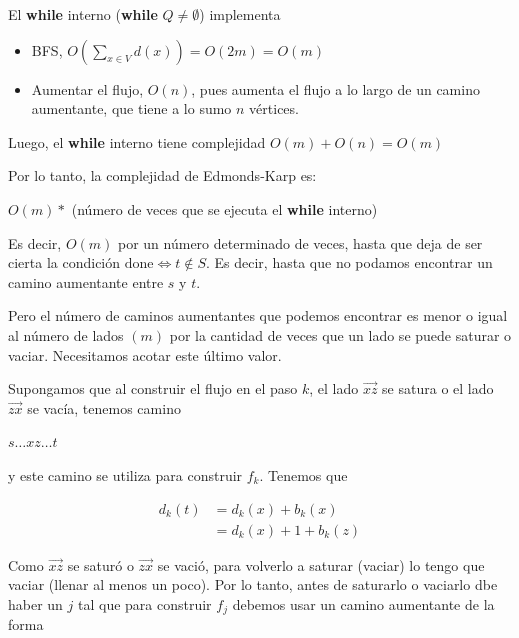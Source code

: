 \documentclass[10pt,a4paper]{article}
\begin{document}
El \textbf{while} interno (\textbf{while} $Q \neq \emptyset$) implementa

\begin{itemize}

	\item BFS, $O(\sum\limits_{x\in V} d(x)) = O(2m) = O(m)$
	\item Aumentar el flujo, $O(n)$, pues aumenta el flujo a lo largo de un camino aumentante, que tiene a lo sumo $n$ vértices.
\end{itemize}

Luego, el \textbf{while} interno tiene complejidad $O(m) + O(n) = O(m)$

Por lo tanto, la complejidad de Edmonds-Karp es:

\begin{center}
$O(m) * $ (número de veces que se ejecuta el \textbf{while} interno)
\end{center}

Es decir, $O(m)$ por un número determinado de veces, hasta que deja de ser cierta la condición $\text{done} \Leftrightarrow t\not \in S$. Es decir, hasta que no podamos encontrar un camino aumentante entre $s$ y $t$.

Pero el número de caminos aumentantes que podemos encontrar es menor o igual al número de lados $(m)$ por la cantidad de veces que un lado se puede saturar o vaciar. Necesitamos acotar este último valor.

Supongamos que al construir el flujo en el paso $k$, el lado $\overrightarrow{xz}$ se satura o el lado $\overrightarrow{zx}$ se vacía, tenemos camino

\begin{center}
$s\dots xz\dots t$
\end{center}

y este camino se utiliza para construir $f_k$. Tenemos que

\begin{center}
\begin{align*} d_k(t) &= d_k(x) + b_k(x)\\ &= d_k(x)+1+b_k(z) \end{align*}
\end{center}

Como $\overrightarrow{xz}$ se saturó o $\overrightarrow{zx}$ se vació, para volverlo a saturar (vaciar) lo tengo que vaciar (llenar al menos un poco). Por lo tanto, antes de saturarlo o vaciarlo dbe haber un $j$ tal que para construir $f_j$ debemos usar un camino aumentante de la forma
\end{document}
